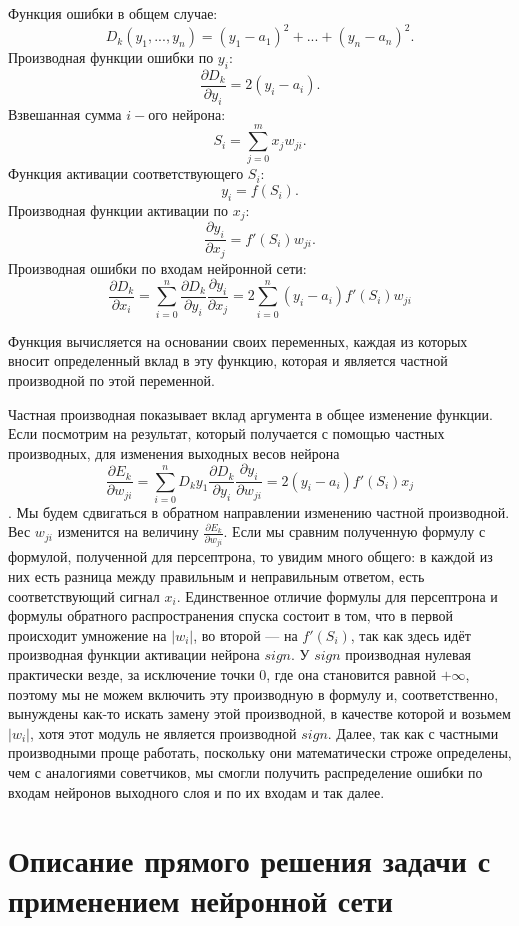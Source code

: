 \documentclass[14pt]{extreport}
\begin{document}
        Функция ошибки в общем случае:
            $$D_k(y_1,...,y_n)=(y_1-a_1)^2+...+(y_n-a_n)^2.$$
        Производная функции ошибки по $y_i$:
            $$\frac{\partial{D_k}}{\partial{y_i}}=2(y_i-a_i).$$
        Взвешанная сумма $i-$ого нейрона:
            $$S_i=\sum_{j=0}^{m}x_j w_{ji}.$$
        Функция активации соответствующего $S_i$:
            $$y_i=f(S_i).$$
        Производная функции активации по $x_j$:
            $$\frac{\partial{y_i}}{\partial{x_j}}={f'(S_i)w_{ji}}.$$
        Производная ошибки по входам нейронной сети:
            $$\frac{\partial{D_k}}{\partial {x_i}}=\sum_{i=0}^{n}\frac{\partial{D_k}}{\partial {y_i}}\frac{\partial{y_i}}{\partial {x_j}} = 2\sum_{i=0}^{n}(y_i-a_i)f'(S_i)w_{ji}$$

    Функция вычисляется на основании своих переменных, каждая из которых вносит определенный вклад в эту функцию, которая и является частной производной по этой переменной.

    Частная производная показывает вклад аргумента в общее изменение функции. Если посмотрим на результат, который получается с помощью частных производных, для изменения выходных весов нейрона \[\frac{\partial{E_k}}{\partial w_{ji}}=\sum_{i=0}^{n}{D_k}{y_1}\frac{\partial{D_k}}{\partial{y_i}}\frac{\partial{y_i}}{\partial {w_{ji}}} = 2(y_i-a_i)f'(S_i)x_j\]. Мы будем сдвигаться в обратном направлении изменению частной производной. Вес $w_{ji}$ изменится на величину $\frac{\partial{E_k}}{\partial w_{ji}}$. Если мы сравним полученную формулу с формулой, полученной для персептрона, то увидим много общего: в каждой из них есть разница между правильным и неправильным ответом, есть соответствующий сигнал $x_i$. Единственное отличие формулы для персептрона и формулы обратного распространения спуска состоит в том, что в первой происходит умножение на $|w_i|$, во второй --- на $f'(S_i)$, так как здесь идёт производная функции активации нейрона $sign$. У $sign$ производная нулевая практически везде, за исключение точки 0, где она становится равной $+ \infty$, поэтому мы не можем включить эту производную в формулу и, соответственно, вынуждены как-то искать замену этой производной, в качестве которой и возьмем  $|w_i|$, хотя этот модуль не является производной   $sign$. Далее, так как с частными производными проще работать, поскольку они математически строже определены, чем с аналогиями советчиков, мы смогли получить распределение ошибки по входам нейронов выходного слоя и по их входам и так далее.
\newpage
    \chapter{Описание прямого решения задачи с применением нейронной сети}
\end{document}
